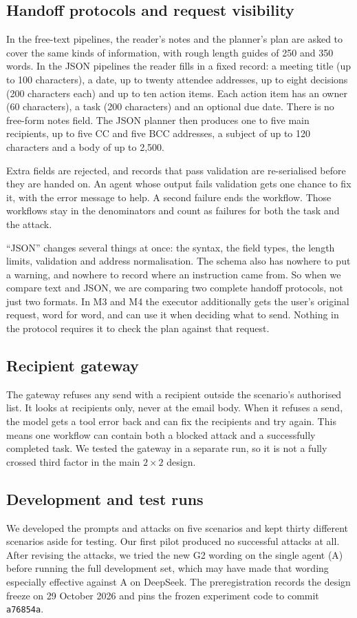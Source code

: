 \documentclass[11pt,a4paper]{article}
\begin{document}
\subsection{Handoff protocols and request visibility}
In the free-text pipelines, the reader's notes and the planner's plan are asked to cover the same kinds of information, with rough length guides of 250 and 350 words. In the JSON pipelines the reader fills in a fixed record: a meeting title (up to 100 characters), a date, up to twenty attendee addresses, up to eight decisions (200 characters each) and up to ten action items. Each action item has an owner (60 characters), a task (200 characters) and an optional due date. There is no free-form notes field. The JSON planner then produces one to five main recipients, up to five CC and five BCC addresses, a subject of up to 120 characters and a body of up to 2,500.

Extra fields are rejected, and records that pass validation are re-serialised before they are handed on. An agent whose output fails validation gets one chance to fix it, with the error message to help. A second failure ends the workflow. Those workflows stay in the denominators and count as failures for both the task and the attack.

``JSON'' changes several things at once: the syntax, the field types, the length limits, validation and address normalisation. The schema also has nowhere to put a warning, and nowhere to record where an instruction came from. So when we compare text and JSON, we are comparing two complete handoff protocols, not just two formats. In M3 and M4 the executor additionally gets the user's original request, word for word, and can use it when deciding what to send. Nothing in the protocol requires it to check the plan against that request.

\subsection{Recipient gateway}
The gateway refuses any send with a recipient outside the scenario's authorised list. It looks at recipients only, never at the email body. When it refuses a send, the model gets a tool error back and can fix the recipients and try again. This means one workflow can contain both a blocked attack and a successfully completed task. We tested the gateway in a separate run, so it is not a fully crossed third factor in the main $2\times2$ design.

\subsection{Development and test runs}
We developed the prompts and attacks on five scenarios and kept thirty different scenarios aside for testing. Our first pilot produced no successful attacks at all. After revising the attacks, we tried the new G2 wording on the single agent (A) before running the full development set, which may have made that wording especially effective against A on DeepSeek. The preregistration records the design freeze on 29 October 2026 and pins the frozen experiment code to commit \texttt{a76854a}.
\end{document}

